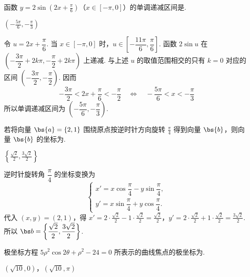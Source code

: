 \documentclass[UTF8,a4paper,oneside,11pt]{ctexbook}
\begin{document}
\begin{problem}
函数 \(y = 2\sin\left( 2x + \frac{\pi}{6} \right)\)（\(x \in \left[ -\pi, 0 \right]\)）的单调递减区间是\fillinblank{}.
\end{problem}

\begin{answer}
\(\left(-\frac{5\pi}{6},-\frac{\pi}{3}\right)\)
\end{answer}

\begin{solution}
令 \(u=2x+\dfrac\pi6\). 当 \(x\in[-\pi,0]\) 时，\(u\in\left[-\dfrac{11\pi}{6},\dfrac\pi6\right]\). 函数 \(2\sin u\) 在 \(\left(-\dfrac{3\pi}{2}+2k\pi,-\dfrac\pi2+2k\pi\right)\) 上递减. 与上述 \(u\) 的取值范围相交的只有 \(k=0\) 对应的区间 \(\left(-\dfrac{3\pi}{2},-\dfrac\pi2\right)\). 因而
\[
-\frac{3\pi}{2}<2x+\frac\pi6<-\frac\pi2
\quad\Longleftrightarrow\quad
-\frac{5\pi}{6}<x<-\frac\pi3
\]
所以单调递减区间为 \(\left(-\dfrac{5\pi}{6},-\dfrac\pi3\right)\).
\end{solution}

\begin{problem}
若将向量 \(\bs{a} = \{2, 1\}\) 围绕原点按逆时针方向旋转 \(\frac{\pi}{4}\) 得到向量 \(\bs{b}\)，则向量 \(\bs{b}\) 的坐标为\fillinblank{}.
\end{problem}

\begin{answer}
\(\left\{\frac{\sqrt2}{2}, \frac{3\sqrt2}{2}\right\}\)
\end{answer}

\begin{solution}
逆时针旋转角 \(\dfrac\pi4\) 的坐标变换为
\[
\begin{cases}
x'=x\cos\dfrac\pi4-y\sin\dfrac\pi4,\\
y'=x\sin\dfrac\pi4+y\cos\dfrac\pi4.
\end{cases}
\]
代入 \((x,y)=(2,1)\)，得
\(x'=2\cdot\frac{\sqrt2}{2}-1\cdot\frac{\sqrt2}{2}=\frac{\sqrt2}{2}\)，\(y'=2\cdot\frac{\sqrt2}{2}+1\cdot\frac{\sqrt2}{2}=\frac{3\sqrt2}{2}\).
所以 \(\bs b=\left\{\dfrac{\sqrt2}{2},\dfrac{3\sqrt2}{2}\right\}\).
\end{solution}

\begin{problem}
极坐标方程 \(5\rho^2 \cos 2\theta + \rho^2 - 24 = 0\) 所表示的曲线焦点的极坐标为\fillinblank{}.
\end{problem}

\begin{answer}
\(\left(\sqrt{10},0\right)\)，\(\left(\sqrt{10},\pi\right)\)
\end{answer}
\end{document}
